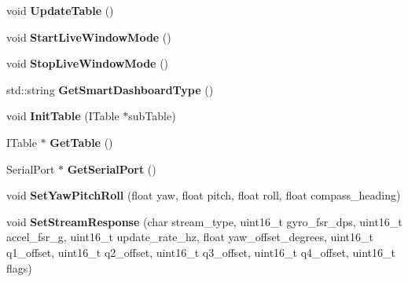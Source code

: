 \begin{DoxyCompactItemize}
\item 
\hypertarget{class_i_m_u_ab0dbda1a844ff67053b079b0dc9cb2d2}{}void {\bfseries Update\+Table} ()\label{class_i_m_u_ab0dbda1a844ff67053b079b0dc9cb2d2}

\item 
\hypertarget{class_i_m_u_aeb6fa87e7c59b22468102cb880948f8c}{}void {\bfseries Start\+Live\+Window\+Mode} ()\label{class_i_m_u_aeb6fa87e7c59b22468102cb880948f8c}

\item 
\hypertarget{class_i_m_u_ad84477436f7a01306204f74a917428fa}{}void {\bfseries Stop\+Live\+Window\+Mode} ()\label{class_i_m_u_ad84477436f7a01306204f74a917428fa}

\item 
\hypertarget{class_i_m_u_ac1b122983651c9f0d8892aceecaaba7e}{}std\+::string {\bfseries Get\+Smart\+Dashboard\+Type} ()\label{class_i_m_u_ac1b122983651c9f0d8892aceecaaba7e}

\item 
\hypertarget{class_i_m_u_a0f1e2ba7829c650d1e423f51db79fab0}{}void {\bfseries Init\+Table} (I\+Table $\ast$sub\+Table)\label{class_i_m_u_a0f1e2ba7829c650d1e423f51db79fab0}

\item 
\hypertarget{class_i_m_u_aba2941d8d4bd8a4a58e1ad36c507582b}{}I\+Table $\ast$ {\bfseries Get\+Table} ()\label{class_i_m_u_aba2941d8d4bd8a4a58e1ad36c507582b}

\item 
\hypertarget{class_i_m_u_ad9b522b7a9e8843d1d042f22accb3d03}{}Serial\+Port $\ast$ {\bfseries Get\+Serial\+Port} ()\label{class_i_m_u_ad9b522b7a9e8843d1d042f22accb3d03}

\item 
\hypertarget{class_i_m_u_aa1e9bc2d755f8ec367d13b7440554a9c}{}void {\bfseries Set\+Yaw\+Pitch\+Roll} (float yaw, float pitch, float roll, float compass\+\_\+heading)\label{class_i_m_u_aa1e9bc2d755f8ec367d13b7440554a9c}

\item 
\hypertarget{class_i_m_u_a3c355546b9b43fa8fb5d82d5dd030ca1}{}void {\bfseries Set\+Stream\+Response} (char stream\+\_\+type, uint16\+\_\+t gyro\+\_\+fsr\+\_\+dps, uint16\+\_\+t accel\+\_\+fsr\+\_\+g, uint16\+\_\+t update\+\_\+rate\+\_\+hz, float yaw\+\_\+offset\+\_\+degrees, uint16\+\_\+t q1\+\_\+offset, uint16\+\_\+t q2\+\_\+offset, uint16\+\_\+t q3\+\_\+offset, uint16\+\_\+t q4\+\_\+offset, uint16\+\_\+t flags)\label{class_i_m_u_a3c355546b9b43fa8fb5d82d5dd030ca1}


\end{DoxyCompactItemize}
